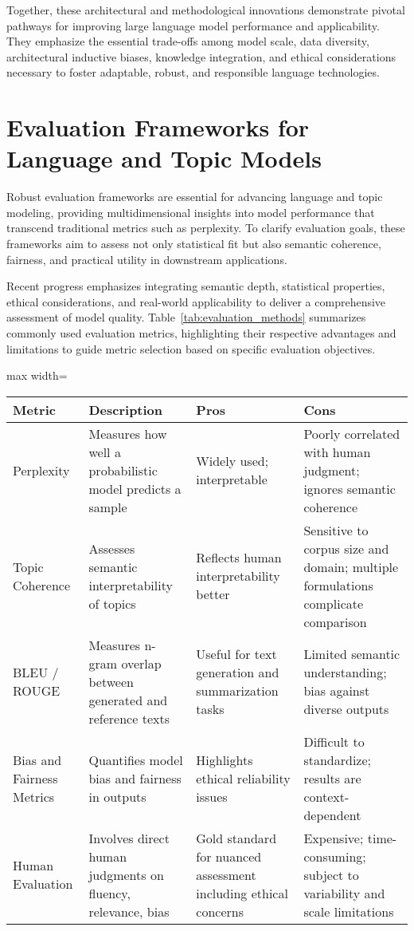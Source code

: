\documentclass[sigconf]{acmart}
\begin{document}
Together, these architectural and methodological innovations demonstrate pivotal pathways for improving large language model performance and applicability. They emphasize the essential trade-offs among model scale, data diversity, architectural inductive biases, knowledge integration, and ethical considerations necessary to foster adaptable, robust, and responsible language technologies.

\section{Evaluation Frameworks for Language and Topic Models}

Robust evaluation frameworks are essential for advancing language and topic modeling, providing multidimensional insights into model performance that transcend traditional metrics such as perplexity. To clarify evaluation goals, these frameworks aim to assess not only statistical fit but also semantic coherence, fairness, and practical utility in downstream applications.

Recent progress emphasizes integrating semantic depth, statistical properties, ethical considerations, and real-world applicability to deliver a comprehensive assessment of model quality. Table~\ref{tab:evaluation_methods} summarizes commonly used evaluation metrics, highlighting their respective advantages and limitations to guide metric selection based on specific evaluation objectives.

\begin{table*}[htbp]
\centering
\caption{Comparison of Evaluation Metrics for Language and Topic Models}
\label{tab:evaluation_methods}
\begin{adjustbox}{max width=\textwidth}
\begin{tabular}{@{}llll@{}}
\toprule
Metric & Description & Pros & Cons \\
\midrule
Perplexity & Measures how well a probabilistic model predicts a sample & Widely used; interpretable & Poorly correlated with human judgment; ignores semantic coherence \\
Topic Coherence & Assesses semantic interpretability of topics & Reflects human interpretability better & Sensitive to corpus size and domain; multiple formulations complicate comparison \\
BLEU / ROUGE & Measures n-gram overlap between generated and reference texts & Useful for text generation and summarization tasks & Limited semantic understanding; bias against diverse outputs \\
Bias and Fairness Metrics & Quantifies model bias and fairness in outputs & Highlights ethical reliability issues & Difficult to standardize; results are context-dependent \\
Human Evaluation & Involves direct human judgments on fluency, relevance, bias & Gold standard for nuanced assessment including ethical concerns & Expensive; time-consuming; subject to variability and scale limitations \\
\bottomrule
\end{tabular}
\end{adjustbox}
\end{table*}
\end{document}
